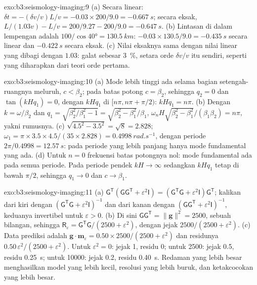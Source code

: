 \begin{solution}{exo:b3:seismology-imaging:9}
(a) Secara linear: $\delta t = -(\delta v/v)L/v = -0.03\times200/9.0 =
\qty{-0.667}{s}$; secara eksak, $L/(1.03v) - L/v = 200/9.27 - 200/9.0 =
\qty{-0.647}{s}$. (b) Lintasan di dalam lempengan adalah $100/\cos\ang{40} =
\qty{130.5}{km}$: $-0.03\times130.5/9.0 = \qty{-0.435}{s}$ secara linear dan
$\qty{-0.422}{s}$ secara eksak. (c) Nilai eksaknya sama dengan nilai linear yang dibagi dengan
$1.03$: galat sebesar \qty{3}{\percent}, setara orde $\delta v/v$ itu sendiri, seperti
yang diharapkan dari teori orde pertama.
\end{solution}

\begin{solution}{exo:b3:seismology-imaging:10}
(a) Mode lebih tinggi ada selama bagian setengah-ruangnya meluruh, $c < \beta_2$; pada
batas potong $c = \beta_2$, sehingga $q_2 = 0$ dan $\tan(kHq_1) = 0$, dengan $kHq_1$ di
$[n\pi, n\pi + \pi/2)$: $kHq_1 = n\pi$. (b) Dengan $k = \omega/\beta_2$ dan
$q_1 = \sqrt{\beta_2^2/\beta_1^2 - 1} = \sqrt{\beta_2^2 - \beta_1^2}/\beta_1$,
$\omega_nH\sqrt{\beta_2^2 - \beta_1^2}/(\beta_1\beta_2) = n\pi$, yakni
rumusnya. (c) $\sqrt{4.5^2 - 3.5^2} = \sqrt8 = 2.828$; $\omega_1 =
\pi\times3.5\times4.5/(35\times2.828) = \qty{0.4998}{rad.s^{-1}}$, dengan periode
$2\pi/0.4998 = \qty{12.57}{s}$: pada periode yang lebih panjang hanya mode fundamental
yang ada. (d) Untuk $n = 0$ frekuensi batas potongnya nol: mode fundamental
ada pada semua periode. Pada periode pendek $kH \to \infty$ sedangkan $kHq_1$ tetap
di bawah $\pi/2$, sehingga $q_1 \to 0$ dan $c \to \beta_1$.
\end{solution}

\begin{solution}{exo:b3:seismology-imaging:11}
(a) $\mathsf G^{\mathsf T}(\mathsf G\mathsf G^{\mathsf T} + \varepsilon^2\mathsf I)
= (\mathsf G^{\mathsf T}\mathsf G + \varepsilon^2\mathsf I)\mathsf G^{\mathsf T}$;
kalikan dari kiri dengan $(\mathsf G^{\mathsf T}\mathsf G + \varepsilon^2
\mathsf I)^{-1}$ dan dari kanan dengan $(\mathsf G\mathsf G^{\mathsf T} +
\varepsilon^2\mathsf I)^{-1}$, keduanya invertibel untuk $\varepsilon > 0$.
(b) Di sini $\mathsf G\mathsf G^{\mathsf T} = \|\mathbf g\|^2 = 2500$, sebuah bilangan,
sehingga $\mathsf R_\varepsilon = \mathsf G^{\mathsf T}\mathsf G/(2500 + \varepsilon^2)$,
dengan jejak $2500/(2500 + \varepsilon^2)$. (c) Data prediksi adalah
$\mathbf g\cdot\mathbf m_\varepsilon = 0.50\times2500/(2500 + \varepsilon^2)$
dan residunya $0.50\,\varepsilon^2/(2500 + \varepsilon^2)$. Untuk
$\varepsilon^2 = 0$: jejak 1, residu 0; untuk 2500: jejak 0.5, residu
\qty{0.25}{s}; untuk \num{10000}: jejak 0.2, residu \qty{0.40}{s}. Redaman yang lebih besar
menghasilkan model yang lebih kecil, resolusi yang lebih buruk, dan ketakcocokan yang lebih besar.
\end{solution}

